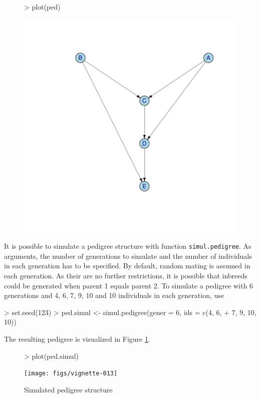 \documentclass[a4paper,11pt]{article}
\begin{document}
\begin{figure}[!h] 
\begin{Schunk}
\begin{Sinput}
> plot(ped)
\end{Sinput}
\end{Schunk}
\includegraphics{figs/vignette-011}
\end{figure}    
      
It is possible to simulate a pedigree structure with function \texttt{simul.pedigree}. As arguments,
the number of generations to simulate and the number of individuals in each generation has to be specified. By default, random mating 
is assumed in each generation. As their are no further restrictions, it is possible that inbreeds could be generated when parent 1 equals parent 2.
To simulate a pedigree with 6 generations and 4, 6, 7, 9, 10 and 10 individuals in each generation, use
\begin{Schunk}
\begin{Sinput}
> set.seed(123)
> ped.simul <- simul.pedigree(gener = 6, ids = c(4, 6, 
+     7, 9, 10, 10))
\end{Sinput}
\end{Schunk}
The resulting pedigree is visualized in Figure \ref{fig:simupedi}.
\begin{figure}[!h]
\begin{Schunk}
\begin{Sinput}
> plot(ped.simul)
\end{Sinput}
\end{Schunk}
\texttt{[image: figs/vignette-013]}
\caption{Simulated pedigree structure}
\label{fig:simupedi}
\end{figure}
\end{document}
